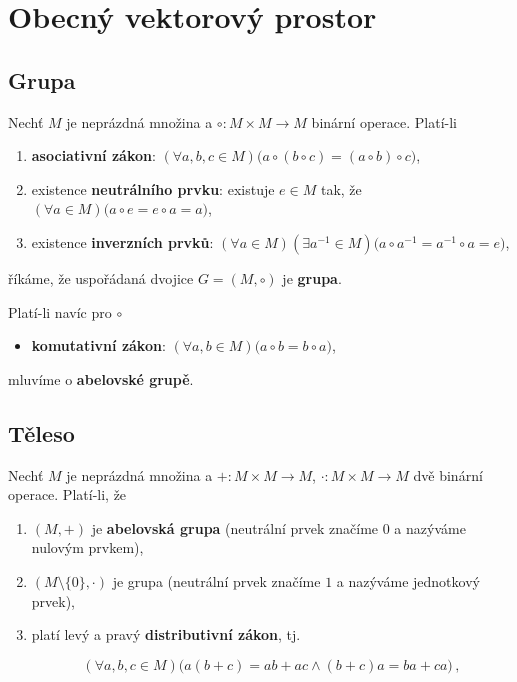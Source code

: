 \section{Obecný vektorový prostor}

\subsection*{Grupa}

Nechť $M$ je neprázdná množina a $\circ: M \times M \to M$ binární operace.
Platí-li

\begin{enumerate}
    \item \textbf{asociativní zákon}: $(\forall a,b,c \in M) \big(a \circ (b \circ c) = (a \circ b) \circ c \big)$,
    \item existence \textbf{neutrálního prvku}: existuje $e \in M$ tak, že $(\forall a
              \in M) \big( a \circ e = e \circ a = a \big)$,
    \item existence \textbf{inverzních prvků}: $(\forall a \in M)(\exists a^{-1}\in M)
              \big(a \circ a^{-1} = a^{-1} \circ a = e\big)$,
\end{enumerate}

říkáme, že uspořádaná dvojice $G = (M, \circ)$ je \textbf{grupa}.

Platí-li navíc pro $\circ$

\begin{itemize}
    \item \textbf{komutativní zákon}: $(\forall a,b \in M) \big(a \circ b = b \circ a\big)$,
\end{itemize}

mluvíme o \textbf{abelovské grupě}.

\subsection*{Těleso}

Nechť $M$ je neprázdná množina a $+: M \times M \to M$, $\cdot : M \times M \to
    M$ dvě binární operace. Platí-li, že

\begin{enumerate}
    \item $(M, +)$ je \textbf{abelovská grupa} (neutrální prvek značíme $0$ a nazýváme nulovým prvkem),
    \item $(M\setminus \{0\}, \cdot)$ je grupa (neutrální prvek značíme $1$ a nazýváme jednotkový prvek),
    \item platí levý a pravý \textbf{distributivní zákon}, tj.

          \[ (\forall a,b,c \in M) \Big( a(b + c) = ab + ac \wedge (b+c)a = ba + ca\Big)\,, \]
\end{enumerate}

